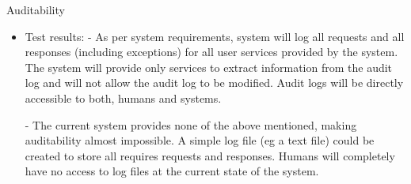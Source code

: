 \item Auditability

\begin{itemize}

\item Test results:
- As per system requirements, system will log all requests and all responses (including exceptions) for all user services provided by the system. The system will provide only services to extract information from the audit log and will not allow the audit log to be modified. Audit logs will be directly accessible to both, humans and systems.

- The current system provides none of the above mentioned, making auditability almost impossible. A simple log file (eg a text file) could be created to store all requires requests and responses. Humans will completely have no access to log files at the current state of the system. \\

\end{itemize}